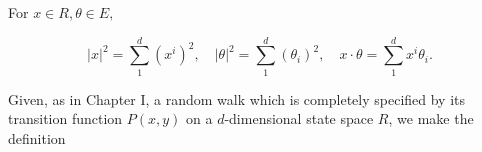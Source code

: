 For $x \in R, \theta \in E,$

$$|x|^2 = \sum_{1}^{d} (x^i)^2, \quad |\theta|^2 = \sum_{1}^{d} (\theta_i)^2, \quad x \cdot \theta = \sum_{1}^{d} x^i \theta_i.$$

Given, as in Chapter I, a random walk which is completely specified by its transition function $P(x,y)$ on a $d$-dimensional state space $R$, we make the definition